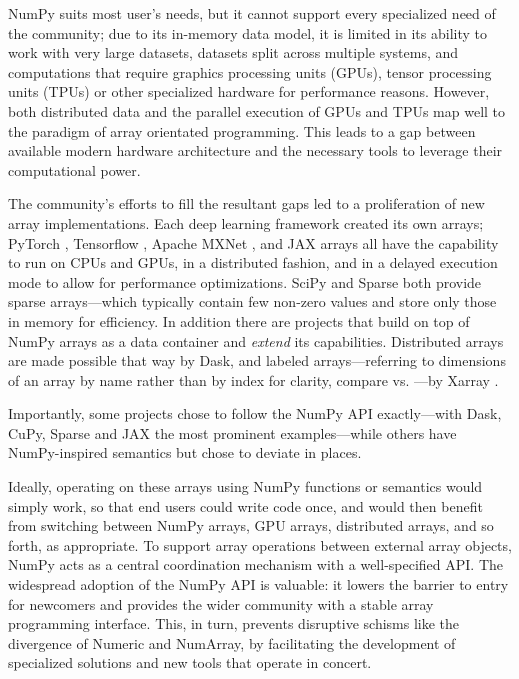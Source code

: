 
NumPy suits most user's needs, but it cannot support every specialized need
of the community; due to its in-memory data model, it is limited in its ability
to work with very large datasets, datasets split across multiple systems, and
computations that require graphics processing units (GPUs), tensor processing
units (TPUs) or other specialized hardware for performance reasons.
However, both distributed data and the parallel execution of GPUs and TPUs
map well to the paradigm of array orientated programming.
This leads to a gap between available modern hardware architecture and the
necessary tools to leverage their computational power.

The community's efforts to fill the resultant gaps led to a
proliferation of new array implementations. Each deep learning framework created
its own arrays; PyTorch \cite{NEURIPS2019_9015},
Tensorflow \cite{abadi2016tensorflow}, Apache MXNet \cite{chen2015mxnet},
and JAX \cite{jax2018github} arrays all have the
capability to run on CPUs and GPUs, in a distributed fashion, and in a delayed
execution mode to allow for performance optimizations.  SciPy and Sparse both
provide sparse arrays---which typically contain few non-zero values and store
only those in memory for efficiency.
In addition there are projects that build on top of NumPy arrays as a data
container and \textit{extend} its capabilities.  Distributed arrays are
made possible that way by Dask, and labeled arrays---referring to dimensions of
an array by name rather than by index for clarity, compare  vs.
---by Xarray \cite{hoyer2017xarray}.

Importantly, some projects chose to follow the NumPy API exactly---with Dask,
CuPy, Sparse and JAX the most prominent examples---while others have
NumPy-inspired semantics but chose to deviate in places.


Ideally, operating on these arrays using NumPy functions or semantics would
simply work, so that end users could write code once, and would then benefit
from switching between NumPy arrays, GPU arrays, distributed arrays, and so
forth, as appropriate.
To support array operations between external array objects, NumPy
acts as a central coordination mechanism with a well-specified API.
The widespread adoption of the NumPy API is valuable: it lowers the
barrier to entry for newcomers and provides the wider community with a
stable array programming interface. This, in turn, prevents disruptive
schisms like the divergence of Numeric and NumArray, by facilitating
the development of specialized solutions and new tools that operate in
concert.

